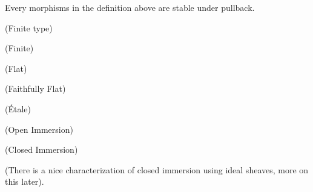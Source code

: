 \begin{proposition}
    Every morphisms in the definition above are stable under pullback.
\end{proposition}

\begin{example}(Finite type)
    
\end{example}

\begin{example}(Finite)
    
\end{example}

\begin{example}(Flat)
    
\end{example}

\begin{example}(Faithfully Flat)
    
\end{example}

\begin{example}(Étale)

\end{example}

\begin{example}(Open Immersion)

\end{example}

\begin{example}(Closed Immersion)

\end{example}(There is a nice characterization of closed immersion using ideal sheaves, more on this later).
